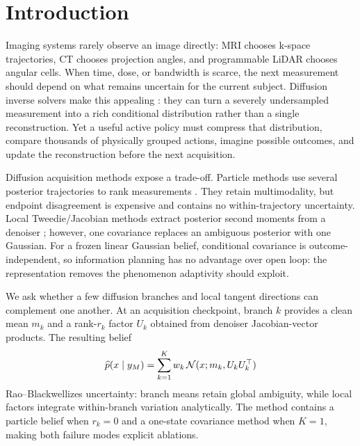\section{Introduction}
\label{sec:introduction}

Imaging systems rarely observe an image directly: MRI chooses k-space
trajectories, CT chooses projection angles, and programmable LiDAR chooses
angular cells.  When time, dose, or bandwidth is scarce,
the next measurement should depend on what remains uncertain for the current
subject.  Diffusion inverse solvers make this appealing
\cite{song2023pigdm,chung2023dps}: they can turn a severely
undersampled measurement into a rich conditional distribution rather than a
single reconstruction.  Yet a useful active policy must compress that
distribution, compare thousands of physically grouped actions, imagine
possible outcomes, and update the reconstruction before the next acquisition.

Diffusion acquisition methods expose a trade-off.
Particle methods use several posterior trajectories to rank measurements
\cite{nolan2025ads,elata2024adasense,morssy2024informed}.  They retain
multimodality, but endpoint disagreement is expensive and contains no
within-trajectory uncertainty.  Local Tweedie/Jacobian methods extract
posterior second moments from a denoiser
\cite{manor2024posterior,rissanen2025freehunch,schioppa2026covariance}; however,
one covariance replaces an ambiguous posterior with one Gaussian.  For a
frozen linear Gaussian belief, conditional covariance is outcome-independent,
so information planning has no advantage over open loop: the representation
removes the phenomenon adaptivity should exploit.

We ask whether a few diffusion branches and local tangent directions can
complement one another.  At an
acquisition checkpoint, branch $k$ provides a clean mean $m_k$ and a
rank-$r_k$ factor $U_k$ obtained from denoiser Jacobian-vector products.  The
resulting belief
\begin{equation}
    \widehat p(x\mid y_M)
    =\sum_{k=1}^{K} w_k\,
      \mathcal{N}(x;m_k,U_kU_k^\top)
    \label{eq:intro-mixture}
\end{equation}
Rao--Blackwellizes uncertainty: branch means retain global ambiguity, while
local factors integrate within-branch variation analytically.  The method
contains a particle belief when $r_k=0$ and a one-state covariance method when
$K=1$, making both failure modes explicit ablations.

